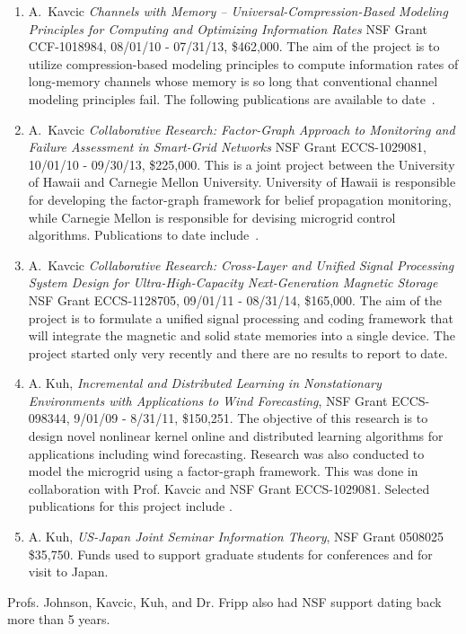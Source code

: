 \begin{enumerate}
\item A.~Kavcic {\em Channels with Memory -- Universal-Compression-Based
    Modeling Principles for Computing and Optimizing Information Rates}
  NSF Grant CCF-1018984, 08/01/10 - 07/31/13, \$462,000. The aim of
  the project is to utilize compression-based modeling principles
  to compute information rates of long-memory channels whose memory
  is so long that conventional channel modeling principles fail. The
  following publications are available to
  date~\cite{Lim11,Yuan11,JS1,JS2,JS3,JS4}.

\item A.~Kavcic {\em Collaborative Research: Factor-Graph Approach to
    Monitoring and Failure Assessment in Smart-Grid Networks}
  NSF Grant ECCS-1029081, 10/01/10 - 09/30/13, \$225,000.
  This is a joint project between the University of Hawaii and
  Carnegie Mellon University. University of Hawaii is responsible
  for developing the factor-graph framework for belief propagation
  monitoring, while Carnegie Mellon is responsible for devising
  microgrid control algorithms. Publications to date
  include~\cite{Hu10,Hu11,Hu11a}.

\item A.~Kavcic {\em Collaborative Research: Cross-Layer and Unified
    Signal Processing System Design for
    Ultra-High-Capacity Next-Generation Magnetic Storage}
  NSF Grant ECCS-1128705, 09/01/11 - 08/31/14, \$165,000.
  The aim of the project is to formulate a unified signal processing
  and coding framework that will integrate the magnetic and solid
  state memories into a single device. The project
  started only very recently and there are no results to report
  to date.

\item A. Kuh, {\em Incremental and Distributed Learning in Nonstationary
    Environments with Applications to Wind Forecasting}, NSF Grant ECCS-098344,
  9/01/09 - 8/31/11, \$150,251.  The objective of this research is to
  design novel nonlinear kernel online and distributed learning algorithms
  for applications including wind forecasting.   Research was also conducted
  to model the microgrid using a factor-graph framework.   This
  was done in collaboration with Prof. Kavcic and NSF Grant ECCS-1029081. 
  Selected publications for
  this project include \cite{kuhetal-10icgc,kowahl-kuh-10ijcnn,Hu10,Hu11,Hu11a}.

\item A. Kuh, {\em US-Japan Joint Seminar Information Theory}, NSF Grant 0508025
  \$35,750.  Funds used to support graduate students for conferences and
  for visit to Japan.
\end{enumerate}

Profs. Johnson, Kavcic,  Kuh, and Dr. Fripp also had NSF support dating back more than 5 years.
